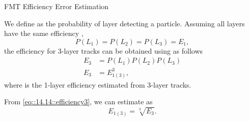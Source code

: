 \begin{frame}{FMT Efficiency Error Estimation}
    \label{20.03::fmt_efficiency_error_estimation}

    \vspace{18pt}

    We define  as the probability of layer  detecting a particle.
    Assuming all layers have the same efficiency ,
    \begin{equation*}
        P(L_1) = P(L_2) = P(L_3) = E_1,
    \end{equation*}
    the efficiency for 3-layer tracks  can be obtained using  as follows
    \begin{align}
        E_3 &= P(L_1)P(L_2)P(L_3)
        \nonumber \\
        E_3 &= E_{1(3)}^3,
        \label{eq::14.14::efficiency3}
    \end{align}
    where  is the 1-layer efficiency estimated from 3-layer tracks.

    \vspace{18pt}

    From \eqref{eq::14.14::efficiency3}, we can estimate  as
    \begin{equation}
        E_{1(3)} = \sqrt[3]{E_3}.
        \label{eq::14.14::efficiency1(3)}
    \end{equation}

\end{frame}

